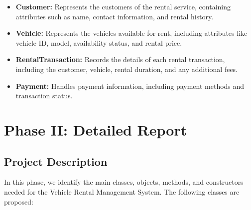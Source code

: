 \documentclass{article}
\begin{document}
\begin{itemize}
    \item \textbf{Customer:} Represents the customers of the rental service, containing attributes such as name, contact information, and rental history.
    \item \textbf{Vehicle:} Represents the vehicles available for rent, including attributes like vehicle ID, model, availability status, and rental price.
    \item \textbf{RentalTransaction:} Records the details of each rental transaction, including the customer, vehicle, rental duration, and any additional fees.
    \item \textbf{Payment:} Handles payment information, including payment methods and transaction status.
\end{itemize}

\newpage

\section{Phase II: Detailed Report}
\subsection{Project Description}
In this phase, we identify the main classes, objects, methods, and constructors needed for the Vehicle Rental Management System. The following classes are proposed:
\end{document}

